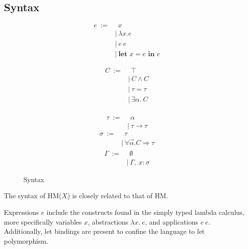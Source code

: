 \documentclass[runningheads]{llncs}
\newcommand{\hmx}{HM($X$)}
\newcommand{\kwlet}{\textbf{let }}
\newcommand{\kwin}{\textbf{ in }}
\begin{document}
\subsection{Syntax}
\begin{figure}[t]
  \centering
  \begin{subfigure}[t]{0.3\textwidth}
    \begin{align*}
      e \ := & \ \ x                    \\
             & | \ λx. e                \\
             & | \ e \ e                \\
             & | \ \kwlet x = e \kwin e
    \end{align*}
  \end{subfigure}
  \begin{subfigure}[t]{0.3\textwidth}
    \begin{align*}
      C \ := & \ \ ⊤       \\
             & | \ C ∧ C   \\
             & | \ τ = τ   \\
             & | \ ∃α. \ C \\
    \end{align*}
  \end{subfigure}
  \begin{subfigure}[t]{0.3\textwidth}
    \begin{align*}
      τ \ := & \ \ α     \\
             & | \ τ → τ
    \end{align*}
    \begin{align*}
      σ \ := & \ \ τ             \\
             & | \ ∀\Vec α.C ⇒ τ
    \end{align*}
    \begin{align*}
      Γ \ := & \ \ ∅           \\
             & | \ Γ , \ x : σ
    \end{align*}
  \end{subfigure}
  \caption{Syntax}
\end{figure}

The syntax of \hmx{} is closely related to that of HM.

Expressions $e$ include the constructs found in the simply typed lambda
calculus, more specifically variables $x$, abstractions $λx. \ e$, and
applications $e \
  e$.
Additionally, let bindings are present to confine the language to let
polymorphism.
\end{document}
